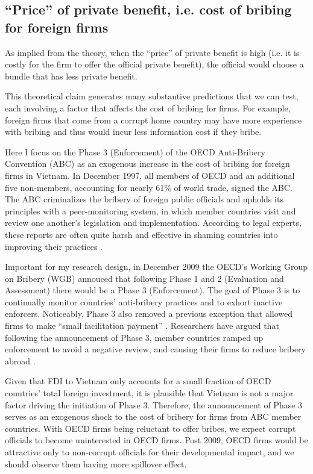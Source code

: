 \subsection{``Price'' of private benefit, i.e. cost of bribing for foreign firms}

As implied from the theory, when the ``price'' of private benefit is high (i.e. it is costly for the firm to offer the official private benefit), the official would choose a bundle that has less private benefit.

This theoretical claim generates many substantive predictions that we can test, each involving a factor that affects the cost of bribing for firms. For example, foreign firms that come from a corrupt home country may have more experience with bribing and thus would incur less information cost if they bribe.

Here I focus on the Phase 3 (Enforcement) of the OECD Anti-Bribery Convention (ABC) as an exogenous increase in the cost of bribing for foreign firms in Vietnam. In December 1997, all members of OECD and an additional five non-members, accounting for nearly 61\% of world trade, signed the ABC. The ABC criminalizes the bribery of foreign public officials and upholds its principles with a peer-monitoring system, in which member countries visit and review one another's legislation and implementation. According to legal experts, these reports are often quite harsh and effective in shaming countries into improving their practices \citep{Tyler2011}.

Important for my research design, in December 2009 the OECD's Working Group on Bribery (WGB) annouced that following Phase 1 and 2 (Evaluation and Assessment) there would be a Phase 3 (Enforcement). The goal of Phase 3 is to continually monitor countries' anti-bribery practices and to exhort inactive enforcers. Noticeably, Phase 3 also removed a previous exception that allowed firms to make ``small facilitation payment'' \citep{Strauss2013}. Researchers have argued that following the announcement of Phase 3, member countries ramped up enforcement to avoid a negative review, and causing their firms to reduce bribery abroad \citep{Malesky2015b}. 

Given that FDI to Vietnam only accounts for a small fraction of OECD countries' total foreign investment, it is plausible that Vietnam is not a major factor driving the initiation of Phase 3. Therefore, the announcement of Phase 3 serves as an exogenous shock to the cost of bribery for firms from ABC member countries. With OECD firms being reluctant to offer bribes, we expect corrupt officials to become uninterested in OECD firms. Post 2009, OECD firms would be attractive only to non-corrupt officials for their developmental impact, and we should observe them having more spillover effect.

